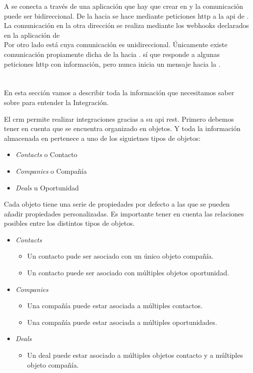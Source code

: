 A \hs{} se conecta a través de una aplicación que hay que crear en \hs{} y la comunicación  puede ser bidireccional. De la \iface{} hacia \hs{} se hace mediante peticiones \acrshort{http} a la \acrshort{api} de \hs{}. 
La comunicación en la otra dirección se realiza mediante los webhooks declarados en la aplicación de \hs{}\\

Por otro lado está \wday{} cuya comunicación es unidireccional. Únicamente existe comunicación propiamente dicha de la \iface{} hacia \wday. \wday{} sí que responde a algunas peticiones \acrshort{http} con información, pero nunca inicia un mensaje hacia la \iface.

\section{\hs{}}
En esta sección vamos a describir toda la información que necesitamos saber sobre \hs{} para entender la Integración.

El \acrshort{crm} \hs{} permite realizar integraciones gracias a su \acrshort{api} \acrshort{rest}.
Primero debemos tener en cuenta que \hs{} se encuentra organizado en objetos. Y toda la información almacenada en \hs{} pertenece a uno de los siguietnes tipos de objetos:

\begin{itemize}
	\item \textit{Contacts} o Contacto
	\item \textit{Companies} o Compañía
	\item \textit{Deals} u Oportunidad
\end{itemize}

Cada objeto tiene una serie de propiedades por defecto a las que se pueden añadir propiedades personalizadas.
Es importante tener en cuenta las relaciones posibles entre los distintos tipos de objetos.

\begin{itemize}
	\item \textit{Contacts}
	\begin{itemize}
		\item Un contacto pude ser asociado con un único objeto compañía.
		\item Un contacto puede ser asociado con múltiples objetos oportunidad.
	\end{itemize}
	\item \textit{Companies}
	\begin{itemize}
		\item Una compañía puede estar asociada a múltiples contactos.
		\item Una compañía puede estar asociada a múltiples oportunidades.
	\end{itemize}
	\item \textit{Deals}
	\begin{itemize}
		\item Un deal puede estar asociado a múltiples objetos contacto y a múltiples objeto compañía.
	\end{itemize}
\end{itemize}


